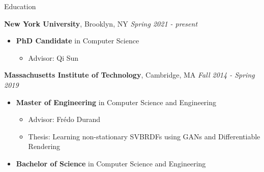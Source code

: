 \documentclass{resume}
\author{Budmonde Duinkharjav}
\begin{document}
\maketitle

\begin{area}{Education}
    \item
        \textbf{New York University}, Brooklyn, NY \hfill \emph{Spring 2021 - present}
        \begin{itemize}
            \item
                \textbf{PhD Candidate} in Computer Science
                \begin{itemize}
                    \item Advisor: Qi Sun
                \end{itemize}
        \end{itemize}
    \item
        \textbf{Massachusetts Institute of Technology}, Cambridge, MA \hfill \emph{Fall 2014 - Spring 2019}
        \begin{itemize}
            \item
                \textbf{Master of Engineering} in Computer Science and Engineering
                \begin{itemize}
                    \item Advisor: Fr\'edo Durand
                    \item Thesis: Learning non-stationary SVBRDFs using GANs and Differentiable Rendering
                \end{itemize}
            \item 
                \textbf{Bachelor of Science} in Computer Science and Engineering
        \end{itemize}
\end{area}
\end{document}
